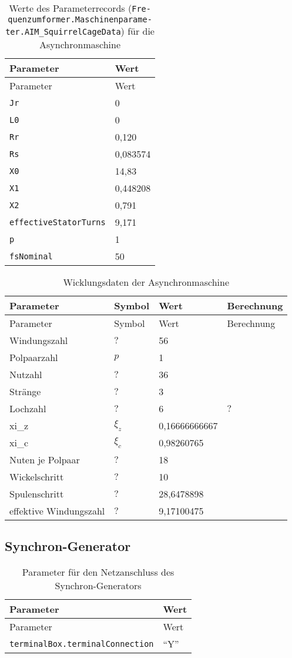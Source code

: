 \begin{longtable}[]{@{}ll@{}}
\caption{Werte des Parameterrecords
(\texttt{Fre­quenz­um­for­mer.­Ma­schi­nen­pa­ra­me­ter.­AIM\_­Squir­rel­Cage­Da­ta})
für die Asynchronmaschine}\tabularnewline
\toprule
Parameter & Wert\tabularnewline
\midrule
\endfirsthead
\toprule
Parameter & Wert\tabularnewline
\midrule
\endhead
\texttt{Jr} & 0\tabularnewline
\texttt{L0} & 0\tabularnewline
\texttt{Rr} & 0,120\tabularnewline
\texttt{Rs} & 0,083574\tabularnewline
\texttt{X0} & 14,83\tabularnewline
\texttt{X1} & 0,448208\tabularnewline
\texttt{X2} & 0,791\tabularnewline
\texttt{effectiveStatorTurns} & 9,171\tabularnewline
\texttt{p} & 1\tabularnewline
\texttt{fsNominal} & 50\tabularnewline
\bottomrule
\end{longtable}
\begin{longtable}[]{@{}llll@{}}
\caption{Wicklungsdaten der Asynchronmaschine}\tabularnewline
\toprule
Parameter & Symbol & Wert & Berechnung\tabularnewline
\midrule
\endfirsthead
\toprule
Parameter & Symbol & Wert & Berechnung\tabularnewline
\midrule
\endhead
Windungszahl & \(?\) & 56 &\tabularnewline
Polpaarzahl & \(p\) & 1 &\tabularnewline
Nutzahl & \(?\) & 36 &\tabularnewline
Stränge & \(?\) & 3 &\tabularnewline
Lochzahl & \(?\) & 6 & \(?\)\tabularnewline
xi\_z & \(\xi_z\) & 0,16666666667 &\tabularnewline
xi\_c & \(\xi_c\) & 0,98260765 &\tabularnewline
Nuten je Polpaar & \(?\) & 18 &\tabularnewline
Wickelschritt & \(?\) & 10 &\tabularnewline
Spulenschritt & \(?\) & 28,6478898 &\tabularnewline
effektive Windungszahl & \(?\) & 9,17100475 &\tabularnewline
\bottomrule
\end{longtable}

\hypertarget{synchron-generator}{%
\subsection{Synchron-Generator}\label{synchron-generator}}

\begin{longtable}[]{@{}ll@{}}
\caption{Parameter für den Netzanschluss des
Synchron-Generators}
\label{tab:NetzSG}
\tabularnewline
\toprule
Parameter & Wert\tabularnewline
\midrule
\endfirsthead
\toprule
Parameter & Wert\tabularnewline
\midrule
\endhead
\texttt{terminalBox.terminalConnection} & ``Y''\tabularnewline
\bottomrule
\end{longtable}


